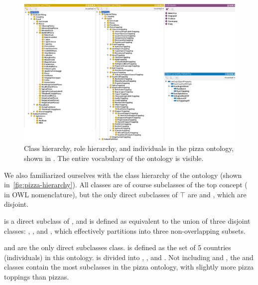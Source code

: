 \begin{figure}
\centering\includegraphics[width=\textwidth]{figures/pizza-hierarchy.png}
\caption{Class hierarchy, role hierarchy, and individuals in the pizza ontology, shown in \Protege{}. The entire vocabulary of the ontology is visible.}
\label{fig:pizza-hierarchy}
\end{figure}

We also familiarized ourselves with the class hierarchy of the ontology (shown in~\autoref{fig:pizza-hierarchy}).
All classes are of course subclasses of the top concept ( in OWL nomenclature), but the only direct subclasses of $\top$ are  and , which are disjoint.

 is a direct subclass of , and is defined as equivalent to the union of three disjoint classes: , , and , which effectively partitions  into three non-overlapping subsets.

 and  are the only direct subclasses  class.
 is defined as the set of 5 countries (individuals) in this ontology.
 is divided into , ,  and .
Not including  and , the  and  classes contain the most subclasses in the pizza ontology, with slightly more pizza toppings than pizzas.

